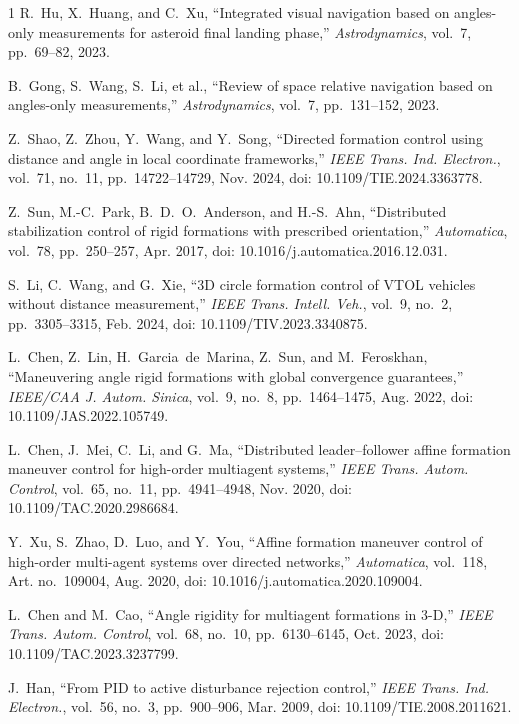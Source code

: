 \documentclass[letterpaper,journal]{IEEEtran}
\theoremstyle{plain}
\theoremstyle{definition}
\theoremstyle{remark}
\begin{document}
\begin{thebibliography}{1}
R.~Hu, X.~Huang, and C.~Xu, ``Integrated visual navigation based on angles-only measurements for asteroid final landing phase,'' \textit{Astrodynamics}, vol.~7, pp.~69--82, 2023.

B.~Gong, S.~Wang, S.~Li, et al., ``Review of space relative navigation based on angles-only measurements,'' \textit{Astrodynamics}, vol.~7, pp.~131--152, 2023.

Z.~Shao, Z.~Zhou, Y.~Wang, and Y.~Song, ``Directed formation control using distance and angle in local coordinate frameworks,'' \textit{IEEE Trans. Ind. Electron.}, vol.~71, no.~11, pp.~14722--14729, Nov. 2024, doi: 10.1109/TIE.2024.3363778.

Z.~Sun, M.-C.~Park, B.~D.~O.~Anderson, and H.-S.~Ahn, ``Distributed stabilization control of rigid formations with prescribed orientation,'' \textit{Automatica}, vol.~78, pp.~250--257, Apr. 2017, doi: 10.1016/j.automatica.2016.12.031.

S.~Li, C.~Wang, and G.~Xie, ``3D circle formation control of VTOL vehicles without distance measurement,'' \textit{IEEE Trans. Intell. Veh.}, vol.~9, no.~2, pp.~3305--3315, Feb. 2024, doi: 10.1109/TIV.2023.3340875.

L.~Chen, Z.~Lin, H.~Garcia~de~Marina, Z.~Sun, and M.~Feroskhan, ``Maneuvering angle rigid formations with global convergence guarantees,'' \textit{IEEE/CAA J. Autom. Sinica}, vol.~9, no.~8, pp.~1464--1475, Aug. 2022, doi: 10.1109/JAS.2022.105749.

L.~Chen, J.~Mei, C.~Li, and G.~Ma, ``Distributed leader--follower affine formation maneuver control for high-order multiagent systems,'' \textit{IEEE Trans. Autom. Control}, vol.~65, no.~11, pp.~4941--4948, Nov. 2020, doi: 10.1109/TAC.2020.2986684.

Y.~Xu, S.~Zhao, D.~Luo, and Y.~You, ``Affine formation maneuver control of high-order multi-agent systems over directed networks,'' \textit{Automatica}, vol.~118, Art. no.~109004, Aug. 2020, doi: 10.1016/j.automatica.2020.109004.

L.~Chen and M.~Cao, ``Angle rigidity for multiagent formations in 3-D,'' \textit{IEEE Trans. Autom. Control}, vol.~68, no.~10, pp.~6130--6145, Oct. 2023, doi: 10.1109/TAC.2023.3237799.

J.~Han, ``From PID to active disturbance rejection control,'' \textit{IEEE Trans. Ind. Electron.}, vol.~56, no.~3, pp.~900--906, Mar. 2009, doi: 10.1109/TIE.2008.2011621.


\end{thebibliography}
\end{document}
